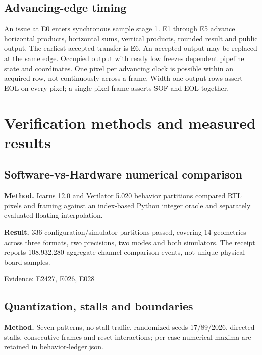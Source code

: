 \documentclass[11pt,a4paper]{article}
\begin{document}
\subsection{Advancing-edge timing}

An issue at E0 enters synchronous sample stage 1. E1 through E5 advance horizontal products,\allowbreak{} horizontal sums,\allowbreak{} vertical products,\allowbreak{} rounded result and public output. The earliest accepted transfer is E6. An accepted output may be replaced at the same edge. Occupied output with ready low freezes dependent pipeline state and coordinates. One pixel per advancing clock is possible within an acquired row,\allowbreak{} not continuously across a frame. Width-one output rows assert EOL on every pixel; a single-pixel frame asserts SOF and EOL together.

\section{Verification methods and measured results}

\subsection{Software-vs-Hardware numerical comparison}

\textbf{Method.} Icarus 12.0 and Verilator 5.020 behavior partitions compared RTL pixels and framing against an index-based Python integer oracle and separately evaluated floating interpolation.

\textbf{Result.} 336 configuration/\allowbreak{}simulator partitions passed,\allowbreak{} covering 14 geometries across three formats,\allowbreak{} two precisions,\allowbreak{} two modes and both simulators. The receipt reports 108,\allowbreak{}932,\allowbreak{}280 aggregate channel-comparison events,\allowbreak{} not unique physical-board samples.

{\small Evidence: E2427,\allowbreak{} E026,\allowbreak{} E028}

\subsection{Quantization,\allowbreak{} stalls and boundaries}

\textbf{Method.} Seven patterns,\allowbreak{} no-stall traffic,\allowbreak{} randomized seeds 17/\allowbreak{}89/\allowbreak{}2026,\allowbreak{} directed stalls,\allowbreak{} consecutive frames and reset interactions; per-case numerical maxima are retained in behavior-ledger.json.
\end{document}
